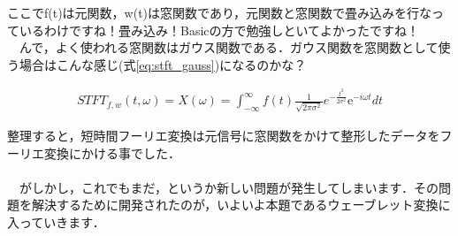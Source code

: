\documentclass[11pt,a4paper,uplatex]{ujreport} 	%
\begin{document}
ここでf(t)は元関数，w(t)は窓関数であり，元関数と窓関数で畳み込みを行なっているわけですね！畳み込み！Basicの方で勉強しといてよかったですね！\\
　んで，よく使われる窓関数はガウス関数である．ガウス関数を窓関数として使う場合はこんな感じ(式\ref{eq:stft_gauss})になるのかな？

\begin{eqnarray}
STFT_{f,w}(t, \omega) = X(\omega) = \int_{-\infty}^{\infty} f(t) \frac{1}{\sqrt{2\pi\sigma^2}}e^{-\frac{t^2}{2\sigma^2}}\mathrm{e}^{-i\omega t} dt
\label{eq:stft_gauss}
\end{eqnarray}

整理すると，短時間フーリエ変換は元信号に窓関数をかけて整形したデータをフーリエ変換にかける事でした．\\
\\
　がしかし，これでもまだ，というか新しい問題が発生してしまいます．その問題を解決するために開発されたのが，いよいよ本題であるウェーブレット変換に入っていきます．　
\end{document}
